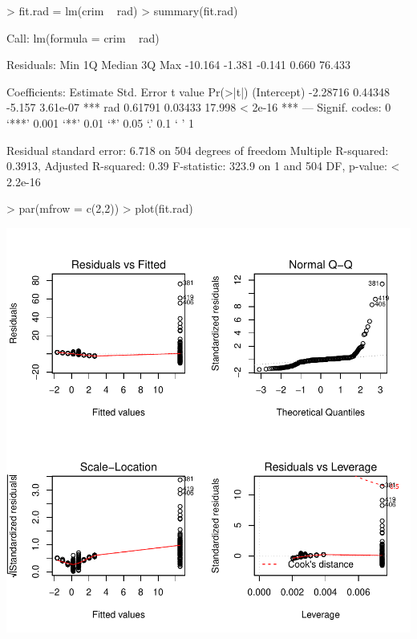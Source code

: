 \documentclass[a4paper]{article}
\begin{document}
\begin{Schunk}
\begin{Sinput}
> fit.rad = lm(crim ~ rad)
> summary(fit.rad)
\end{Sinput}
\begin{Soutput}
Call:
lm(formula = crim ~ rad)

Residuals:
    Min      1Q  Median      3Q     Max 
-10.164  -1.381  -0.141   0.660  76.433 

Coefficients:
            Estimate Std. Error t value Pr(>|t|)    
(Intercept) -2.28716    0.44348  -5.157 3.61e-07 ***
rad          0.61791    0.03433  17.998  < 2e-16 ***
---
Signif. codes:  0 ‘***’ 0.001 ‘**’ 0.01 ‘*’ 0.05 ‘.’ 0.1 ‘ ’ 1

Residual standard error: 6.718 on 504 degrees of freedom
Multiple R-squared:  0.3913,	Adjusted R-squared:   0.39 
F-statistic: 323.9 on 1 and 504 DF,  p-value: < 2.2e-16
\end{Soutput}
\begin{Sinput}
> par(mfrow = c(2,2))
> plot(fit.rad)
\end{Sinput}
\end{Schunk}
\includegraphics{mutivariblelm-rad}
\end{document}
